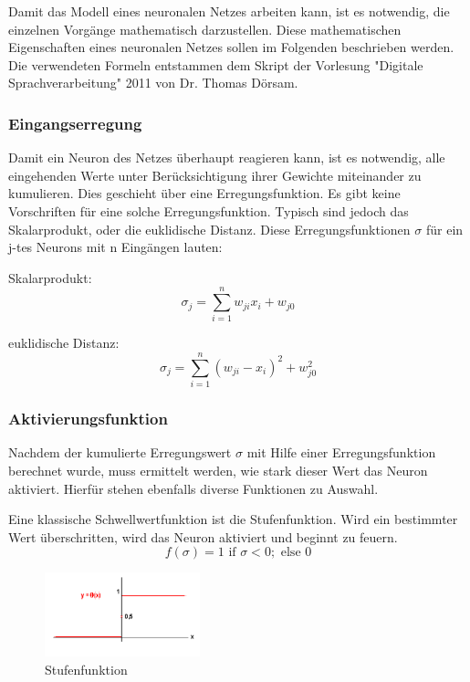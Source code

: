 Damit das Modell eines neuronalen Netzes arbeiten kann, ist es notwendig, die einzelnen Vorgänge mathematisch darzustellen. Diese mathematischen Eigenschaften eines neuronalen Netzes sollen im Folgenden beschrieben werden. Die verwendeten Formeln entstammen dem Skript der Vorlesung "Digitale Sprachverarbeitung" 2011 von Dr. Thomas Dörsam.
\subsubsection{Eingangserregung}
Damit ein Neuron des Netzes überhaupt reagieren kann, ist es notwendig, alle eingehenden Werte unter Berücksichtigung ihrer Gewichte miteinander zu kumulieren. Dies geschieht über eine Erregungsfunktion. Es gibt keine Vorschriften für eine solche Erregungsfunktion. Typisch sind jedoch das Skalarprodukt, oder die euklidische Distanz. Diese Erregungsfunktionen $\sigma$ für ein j-tes Neurons mit n Eingängen lauten:

Skalarprodukt:
\begin{equation}
  \sigma_{j} = \sum_{i=1}^{n} w_{ji} x_{i}+w_{j0}
\end{equation} 

euklidische Distanz:
\begin{equation}
  \sigma_{j} = \sum_{i=1}^{n} (w_{ji} - x_{i})^2+w_{j0}^2
\end{equation} 

\subsubsection{Aktivierungsfunktion}
Nachdem der kumulierte Erregungswert $\sigma$ mit Hilfe einer Erregungsfunktion berechnet wurde, muss ermittelt werden, wie stark dieser Wert das Neuron aktiviert. Hierfür stehen ebenfalls diverse Funktionen zu Auswahl.

Eine klassische Schwellwertfunktion ist die Stufenfunktion. Wird ein bestimmter Wert überschritten, wird das Neuron aktiviert und beginnt zu feuern.
\begin{equation}
f(\sigma) = 1 \mbox{ if } \sigma < 0;  \mbox{ else } 0
\end{equation}
\begin{figure}[h]
\centering
\includegraphics[width=0.4\textwidth]{pictures/stufenfunktion.png}
\caption{Stufenfunktion \cite{bib:stufe}}
\end{figure}

